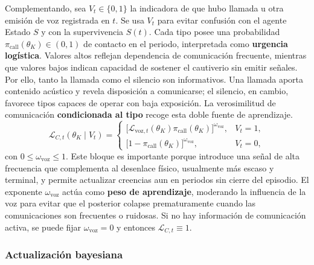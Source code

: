 \documentclass[12pt]{article}
\theoremstyle{definition}
\theoremstyle{remark}
\newcommand{\1}{\mathbf{1}}
\begin{document}
Complementando, sea $V_t\in\{0,1\}$ la indicadora de que hubo llamada u otra emisión de voz registrada en $t$. Se usa $V_t$ para evitar confusión con el agente Estado $S$ y con la supervivencia $S(t)$. Cada tipo posee una probabilidad $\pi_{\mathrm{call}}(\theta_K)\in(0,1)$ de contacto en el periodo, interpretada como \textbf{urgencia logística}. Valores altos reflejan dependencia de comunicación frecuente, mientras que valores bajos indican capacidad de sostener el cautiverio sin emitir señales. Por ello, tanto la llamada como el silencio son informativos. Una llamada aporta contenido acústico y revela disposición a comunicarse; el silencio, en cambio, favorece tipos capaces de operar con baja exposición. La verosimilitud de comunicación \textbf{condicionada al tipo} recoge esta doble fuente de aprendizaje.
\begin{equation}
\label{eq:LC}
\mathcal{L}_{C,t}(\theta_K \mid V_t)=\begin{cases}\bigl[\mathcal{L}_{\mathrm{voz},t}(\theta_K)\pi_{\mathrm{call}}(\theta_K)\bigr]^{\omega_{\mathrm{voz}}}, & V_t=1,\\[0.6em]\bigl[1-\pi_{\mathrm{call}}(\theta_K)\bigr]^{\omega_{\mathrm{voz}}}, & V_t=0,\end{cases}
\end{equation}
con $0\le \omega_{\mathrm{voz}}\le 1$. Este bloque es importante porque introduce una señal de alta frecuencia que complementa al desenlace físico, usualmente más escaso y terminal, y permite actualizar creencias aun en periodos sin cierre del episodio. El exponente $\omega_{\mathrm{voz}}$ actúa como \textbf{peso de aprendizaje}, moderando la influencia de la voz para evitar que el posterior colapse prematuramente cuando las comunicaciones son frecuentes o ruidosas. Si no hay información de comunicación activa, se puede fijar $\omega_{\mathrm{voz}}=0$ y entonces $\mathcal{L}_{C,t}\equiv 1$.

\subsubsection{Actualización bayesiana}
\label{sec:bayesian-updating}
\end{document}
